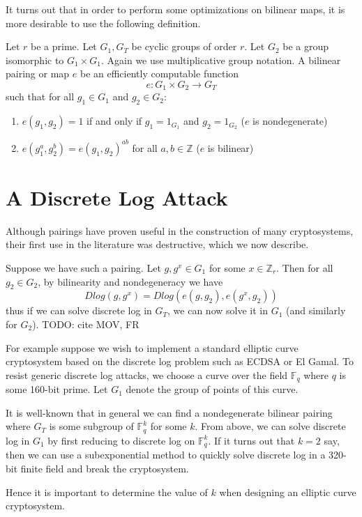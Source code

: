 It turns out that in order to perform some optimizations on bilinear maps,
it is more desirable to use the following definition.

Let $r$ be a prime.
Let $G_1, G_T$ be cyclic groups of order $r$.
Let $G_2$ be a group isomorphic to $G_1 \times G_1$.
Again we use multiplicative group notation.
A bilinear pairing or map $e$ be an efficiently computable function
\[
e:G_1 \times G_2 \rightarrow G_T
\]
such that for all $g_1 \in G_1$ and $g_2 \in G_2$:
\begin{enumerate}
\item
$e(g_1,g_2) = 1$ if and only if $g_1 = 1_{G_1}$ and $g_2 = 1_{G_2}$
($e$ is nondegenerate)
\item
$e(g_1^a, g_2^b) = e(g_1,g_2)^{a b}$ for all $a, b \in \mathbb{Z}$ ($e$ is
bilinear)
\end{enumerate}

\section{A Discrete Log Attack}

Although pairings have proven useful in the construction of many
cryptosystems, their first use in the literature was destructive, which
we now describe.

Suppose we have such a pairing. Let $g, g^x \in G_1$ for some
$x \in \mathbb{Z}_r$. Then for all $g_2 \in G_2$, by
bilinearity and nondegeneracy we have
\[
Dlog(g, g^x) = Dlog({e(g,g_2)}, e(g^x, g_2))
\]
thus if we can solve discrete log in $G_T$, we can now solve it in $G_1$
(and similarly for $G_2$). TODO: cite MOV, FR

For example suppose we wish to implement a standard elliptic curve
cryptosystem based on the discrete log problem such as ECDSA or El Gamal.
To resist generic discrete log attacks, we choose a curve over the field
$\mathbb{F}_q$ where $q$ is some 160-bit prime.
Let $G_1$ denote the group of points of this curve.

It is well-known that in general we can find a nondegenerate
bilinear pairing where $G_T$ is some subgroup of
$\mathbb{F}_q^k$ for some $k$.
From above, we can solve discrete log in $G_1$ by first reducing
to discrete log on $\mathbb{F}_q^k$.
If it turns out that $k = 2$ say, then we can use a subexponential
method to quickly solve discrete log in a 320-bit finite field and
break the cryptosystem.

Hence it is important to determine the value of $k$
when designing an elliptic curve cryptosystem.

